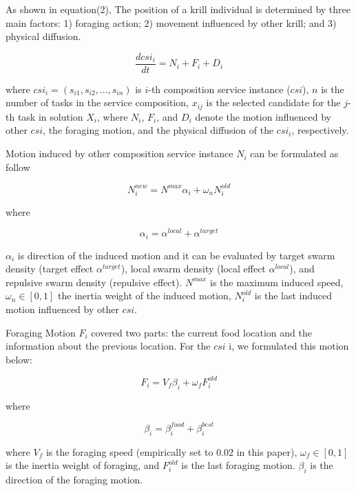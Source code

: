 \documentclass[10pt,journal,compsoc]{IEEEtran}
\begin{document}
As shown in equation(2), The position of a krill individual is determined by three main factors: 1) foraging action; 2) movement influenced by other krill; and 3) physical diffusion. 

\begin{equation}
\frac{dcsi_i}{dt} =N_i+F_i+D_i
\end{equation}

where $csi_i = (s_{i1}, s_{i2}, . . . , s_{in})$ is $i$-th composition service instance ($csi$), $n$ is the number of tasks in the service composition, $x_{ij}$ is the selected candidate for the $j$-th task in solution $X_i$, where $N_i$, $F_i$, and $D_i$ denote the motion influenced by other $csi$, the foraging motion, and the physical diffusion of the $csi_i$, respectively.

Motion induced by other composition service instance $N_i$ can be formulated as follow

\begin{equation}
N^{new}_i = N^{max}\alpha_i + \omega_n N^{old}_i
\end{equation}

where

\begin{equation}
\alpha_i = \alpha^{local}+\alpha^{target}
\end{equation}

$\alpha_i$ is direction of the induced motion and it can be evaluated by target swarm density (target effect $\alpha^{target}$), local swarm density (local effect $\alpha^{local}$), and repulsive swarm density (repulsive effect). $N^{max}$ is the maximum induced speed, $\omega_n \in [0, 1]$ the inertia weight of the induced motion, $N^{old}_{i}$ is the last induced motion influenced by other $csi$.


Foraging Motion $F_i$ covered two parts: the current food location and the information about the previous location. For the $csi$ i, we formulated this motion below:

\begin{equation}
F_i = V_f\beta_i + \omega_f F^{old}_i
\end{equation}

where

\begin{equation}
\beta_i = \beta_i^{food}+\beta_i^{best}
\end{equation}

where $V_f$ is the foraging speed (empirically set to $0.02$ in this paper), $\omega_f∈ [0, 1]$ is the inertia weight of foraging, and $F^{old}_i$ is the last foraging motion. $\beta_i$ is the direction of the foraging motion.
\end{document}
